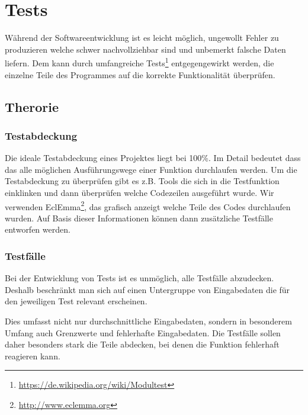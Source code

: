 

\newpage
\section{Tests}

W\"ahrend der Softwareentwicklung ist es leicht m\"oglich, ungewollt Fehler zu produzieren welche schwer nachvollziehbar sind und unbemerkt falsche Daten liefern. Dem kann durch umfangreiche Tests\footnote{\url{https://de.wikipedia.org/wiki/Modultest}} entgegengewirkt werden, die einzelne Teile des Programmes auf die korrekte Funktionalit\"at \"uberpr\"ufen.

\subsection{Therorie}

\subsubsection{Testabdeckung}

Die ideale Testabdeckung eines Projektes liegt bei 100\%. Im Detail bedeutet dass das alle m\"oglichen Ausf\"uhrungswege einer Funktion durchlaufen werden. Um die Testabdeckung zu \"uberpr\"ufen gibt es z.B. Tools die sich in die Testfunktion einklinken und dann \"uberpr\"ufen welche Codezeilen ausgef\"uhrt wurde. Wir verwenden EclEmma\footnote{\url{http://www.eclemma.org}}, das grafisch anzeigt welche Teile des Codes durchlaufen wurden. Auf Basis dieser Informationen k\"onnen dann zus\"atzliche Testf\"alle entworfen werden.

\subsubsection{Testf\"alle}

Bei der Entwicklung von Tests ist es unm\"oglich, alle Testf\"alle abzudecken. Deshalb beschr\"ankt man sich auf einen Untergruppe von Eingabedaten die f\"ur den jeweiligen Test relevant erscheinen.

Dies umfasst nicht nur durchschnittliche Eingabedaten, sondern in besonderem Umfang auch Grenzwerte und fehlerhafte Eingabedaten. Die Testf\"alle sollen daher besonders stark die Teile abdecken, bei denen die Funktion fehlerhaft reagieren kann.

